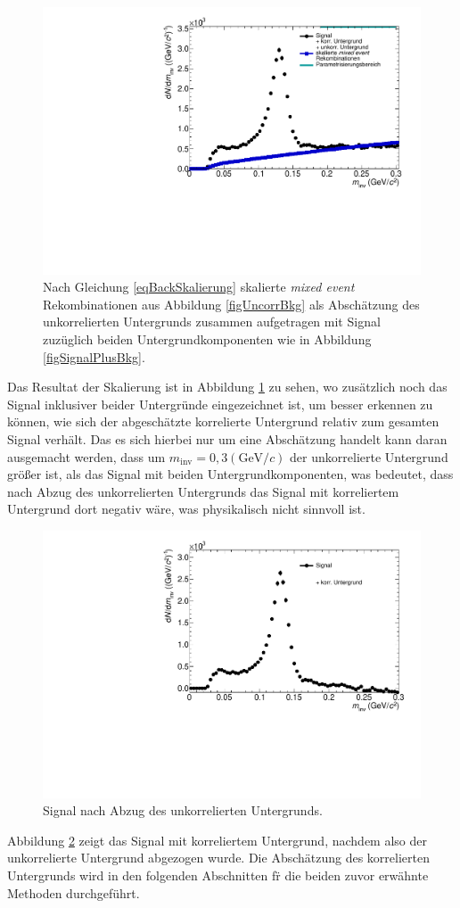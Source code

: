 \begin{figure}[thp]
\centering
\includegraphics[width=.6\linewidth]{hUncorrBkgNorm.pdf}
\caption{Nach Gleichung \ref{eqBackSkalierung} skalierte {\it mixed event} Rekombinationen aus Abbildung \ref{figUncorrBkg} als Absch{\"a}tzung des unkorrelierten Untergrunds zusammen aufgetragen mit Signal zuz{\"u}glich beiden Untergrundkomponenten wie in Abbildung \ref{figSignalPlusBkg}.}
\label{figUncorrBkgNorm}
\end{figure}
\newline
Das Resultat der Skalierung ist in Abbildung \ref{figUncorrBkgNorm} zu sehen, wo zus{\"a}tzlich noch das Signal inklusiver beider Untergr{\"u}nde eingezeichnet ist, um besser erkennen zu k{\"o}nnen, wie sich der abgesch{\"a}tzte korrelierte Untergrund relativ zum gesamten Signal verh{\"a}lt.
Das es sich hierbei nur um eine Absch{\"a}tzung handelt kann daran ausgemacht werden, dass um $m_{\text{inv}} = 0,3 (\text{GeV/}c)$ der unkorrelierte Untergrund gr{\"o}{\ss}er ist, als das Signal mit beiden Untergrundkomponenten, was bedeutet, dass nach Abzug des unkorrelierten Untergrunds das Signal mit korreliertem Untergrund dort negativ w{\"a}re, was physikalisch nicht sinnvoll ist.
\begin{figure}[tbp]
\centering
\includegraphics[width=.6\linewidth]{hInvMass_Data.pdf}
\caption{Signal nach Abzug des unkorrelierten Untergrunds.}
\label{figInvMass_Data}
\end{figure}
\newline
Abbildung \ref{figInvMass_Data} zeigt das Signal mit korreliertem Untergrund, nachdem also der unkorrelierte Untergrund abgezogen wurde.
Die Absch\"atzung des korrelierten Untergrunds wird in den folgenden Abschnitten f\"r die beiden zuvor erw\"ahnte Methoden durchgef\"uhrt.
